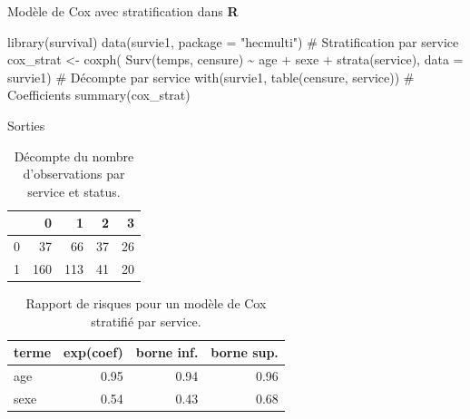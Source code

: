 \documentclass[
  ignorenonframetext,
]{beamer}
\newenvironment{Shaded}{\begin{snugshade}}{\end{snugshade}}
\newcommand{\AttributeTok}[1]{\textcolor[rgb]{0.40,0.45,0.13}{#1}}
\newcommand{\CommentTok}[1]{\textcolor[rgb]{0.37,0.37,0.37}{#1}}
\newcommand{\FunctionTok}[1]{\textcolor[rgb]{0.28,0.35,0.67}{#1}}
\newcommand{\NormalTok}[1]{\textcolor[rgb]{0.00,0.23,0.31}{#1}}
\newcommand{\OtherTok}[1]{\textcolor[rgb]{0.00,0.23,0.31}{#1}}
\newcommand{\SpecialCharTok}[1]{\textcolor[rgb]{0.37,0.37,0.37}{#1}}
\newcommand{\StringTok}[1]{\textcolor[rgb]{0.13,0.47,0.30}{#1}}
\begin{document}
\begin{frame}[fragile]{Modèle de Cox avec stratification dans
\textbf{R}}
\protect\hypertarget{moduxe8le-de-cox-avec-stratification-dans-r}{}
\begin{Shaded}
\begin{Highlighting}[numbers=left,,]
\FunctionTok{library}\NormalTok{(survival)}
\FunctionTok{data}\NormalTok{(survie1, }\AttributeTok{package =} \StringTok{"hecmulti"}\NormalTok{)}
\CommentTok{\# Stratification par service}
\NormalTok{cox\_strat }\OtherTok{\textless{}{-}} \FunctionTok{coxph}\NormalTok{(}
  \FunctionTok{Surv}\NormalTok{(temps, censure) }\SpecialCharTok{\textasciitilde{}}\NormalTok{ age }\SpecialCharTok{+}\NormalTok{ sexe }\SpecialCharTok{+} \FunctionTok{strata}\NormalTok{(service), }
  \AttributeTok{data =}\NormalTok{ survie1)}
\CommentTok{\# Décompte par service}
\FunctionTok{with}\NormalTok{(survie1, }\FunctionTok{table}\NormalTok{(censure, service))}
\CommentTok{\# Coefficients}
\FunctionTok{summary}\NormalTok{(cox\_strat)}
\end{Highlighting}
\end{Shaded}
\end{frame}

\begin{frame}{Sorties}
\protect\hypertarget{sorties}{}
\hypertarget{tbl-nserv}{}
\begin{table}
\caption{\label{tbl-nserv}Décompte du nombre d'observations par service et status. }\tabularnewline

\centering
\begin{tabular}{lrrrr}
\toprule
  & 0 & 1 & 2 & 3\\
\midrule
0 & 37 & 66 & 37 & 26\\
1 & 160 & 113 & 41 & 20\\
\bottomrule
\end{tabular}
\end{table}

\hypertarget{tbl-coxstratif}{}
\begin{table}
\caption{\label{tbl-coxstratif}Rapport de risques pour un modèle de Cox stratifié par service. }\tabularnewline

\centering
\begin{tabular}{lrrr}
\toprule
terme & exp(coef) & borne inf. & borne sup.\\
\midrule
age & 0.95 & 0.94 & 0.96\\
sexe & 0.54 & 0.43 & 0.68\\
\bottomrule
\end{tabular}
\end{table}
\end{frame}
\end{document}
